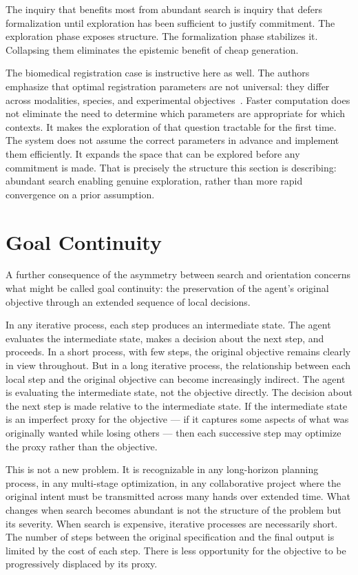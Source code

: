The inquiry that benefits most from abundant search is inquiry that defers
formalization until exploration has been sufficient to justify commitment.
The exploration phase exposes structure. The formalization phase stabilizes it.
Collapsing them eliminates the epistemic benefit of cheap generation.

The biomedical registration case is instructive here as well. The authors
emphasize that optimal registration parameters are not universal: they differ
across modalities, species, and experimental objectives~\cite{fireants2026}.
Faster computation does not eliminate the need to determine which parameters
are appropriate for which contexts. It makes the exploration of that question
tractable for the first time. The system does not assume the correct parameters
in advance and implement them efficiently. It expands the space that can be
explored before any commitment is made. That is precisely the structure this
section is describing: abundant search enabling genuine exploration, rather
than more rapid convergence on a prior assumption.

\section{Goal Continuity}

A further consequence of the asymmetry between search and orientation concerns
what might be called goal continuity: the preservation of the agent's original
objective through an extended sequence of local decisions.

In any iterative process, each step produces an intermediate state. The agent
evaluates the intermediate state, makes a decision about the next step, and
proceeds. In a short process, with few steps, the original objective remains
clearly in view throughout. But in a long iterative process, the relationship
between each local step and the original objective can become increasingly
indirect. The agent is evaluating the intermediate state, not the objective
directly. The decision about the next step is made relative to the intermediate
state. If the intermediate state is an imperfect proxy for the objective ---
if it captures some aspects of what was originally wanted while losing others
--- then each successive step may optimize the proxy rather than the objective.

This is not a new problem. It is recognizable in any long-horizon planning
process, in any multi-stage optimization, in any collaborative project where
the original intent must be transmitted across many hands over extended time.
What changes when search becomes abundant is not the structure of the problem
but its severity. When search is expensive, iterative processes are necessarily
short. The number of steps between the original specification and the final
output is limited by the cost of each step. There is less opportunity for the
objective to be progressively displaced by its proxy.

